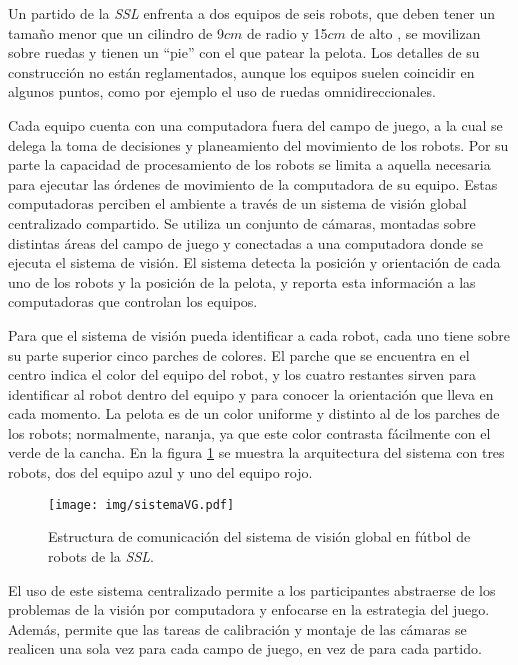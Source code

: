 Un partido de la \emph{SSL} enfrenta a dos equipos de seis robots, que deben
tener un tamaño menor que un cilindro de 9$cm$ de radio y 15$cm$ de alto
\cite{sslrules2015}, se movilizan sobre ruedas y tienen un ``pie'' con el que
patear la pelota. Los detalles de su construcción no están reglamentados,
aunque los equipos suelen coincidir en algunos puntos, como por ejemplo el uso
de ruedas omnidireccionales.

Cada equipo cuenta con una computadora fuera del campo de juego, a la cual se
delega la toma de decisiones y planeamiento del movimiento de los robots. Por
su parte la capacidad de procesamiento de los robots se limita a aquella
necesaria para ejecutar las órdenes de movimiento de la computadora de su
equipo. Estas computadoras perciben el ambiente a través de un sistema de
visión global centralizado compartido. Se utiliza un conjunto de cámaras,
montadas sobre distintas áreas del campo de juego y conectadas a una
computadora donde se ejecuta el sistema de visión. El sistema detecta la
posición y orientación de cada uno de los robots y la posición de la pelota, y
reporta esta información a las computadoras que controlan los equipos.

Para que el sistema de visión pueda identificar a cada robot, cada uno tiene
sobre su parte superior cinco parches de colores. El parche que se encuentra
en el centro indica el color del equipo del robot, y los cuatro restantes
sirven para identificar al robot dentro del equipo y para conocer la
orientación que lleva en cada momento. La pelota es de un color uniforme y
distinto al de los parches de los robots; normalmente, naranja, ya que este
color contrasta fácilmente con el verde de la cancha. En la figura
\ref{sistemaVG} se muestra la arquitectura del sistema con tres robots, dos
del equipo azul y uno del equipo rojo.

\begin{figure}[h]

	\texttt{[image: img/sistemaVG.pdf]}

	\caption{Estructura de comunicación del sistema de visión global en
	fútbol de robots de la \emph{SSL}.}

	\label{sistemaVG}

\end{figure}

El uso de este sistema centralizado permite a los participantes abstraerse de
los problemas de la visión por computadora y enfocarse en la estrategia del
juego. Además, permite que las tareas de calibración y montaje de las cámaras se
realicen una sola vez para cada campo de juego, en vez de para cada partido.

